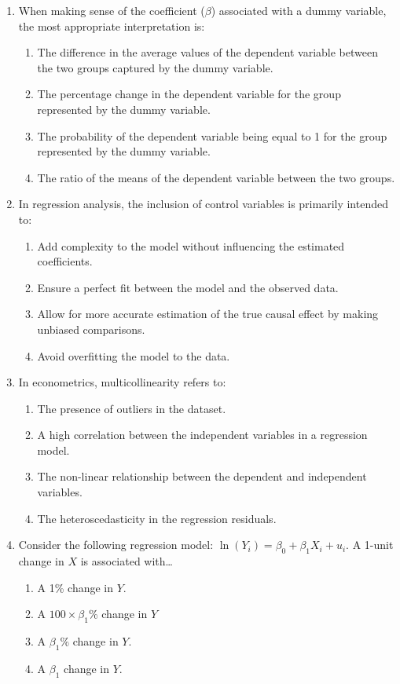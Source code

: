 \documentclass{article}
\begin{document}
\begin{enumerate}[label=\textbf{\arabic*.}]
    \item When making sense of the coefficient ($\beta$) associated with a dummy variable, the most appropriate interpretation is:
    \begin{enumerate}[label=\Alph*)]
        \item The difference in the average values of the dependent variable between the two groups captured by the dummy variable.
        \item The percentage change in the dependent variable for the group represented by the dummy variable.
        \item The probability of the dependent variable being equal to 1 for the group represented by the dummy variable.
        \item The ratio of the means of the dependent variable between the two groups.
    \end{enumerate}

    \item In regression analysis, the inclusion of control variables is primarily intended to:
    \begin{enumerate}[label=\Alph*)]
        \item Add complexity to the model without influencing the estimated coefficients.
        \item Ensure a perfect fit between the model and the observed data.
        \item Allow for more accurate estimation of the true causal effect by making unbiased comparisons.
        \item Avoid overfitting the model to the data.
    \end{enumerate}

    \item In econometrics, multicollinearity refers to:
    \begin{enumerate}[label=\Alph*)]
        \item The presence of outliers in the dataset.
        \item A high correlation between the independent variables in a regression model.
        \item The non-linear relationship between the dependent and independent variables.
        \item The heteroscedasticity in the regression residuals.
    \end{enumerate}
\newpage
    \item Consider the following regression model: $\ln(Y_i) = \beta_0 + \beta_1 X_i + u_i$. A 1-unit change in $X$ is associated with…
    \begin{enumerate}[label=\Alph*)]
        \item A 1\% change in $Y$.
        \item A $100 \times \beta_1 \%$ change in $Y$
        \item A $\beta_1 \%$ change in $Y$. %
        \item A $\beta_1$ change in $Y$.
    \end{enumerate}


\end{enumerate}
\end{document}
